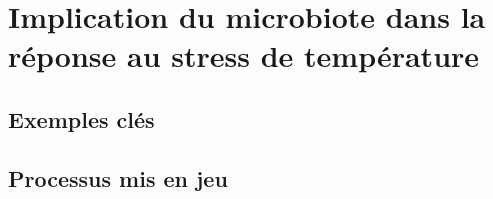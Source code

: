 \section{Implication du microbiote dans la réponse au stress de température} %
\label{sec:implicationµbiote}
	
	\subsection{Exemples clés} %
	\label{sub:exemples}
		

	\subsection{Processus mis en jeu} %
	\label{sub:process}
		

